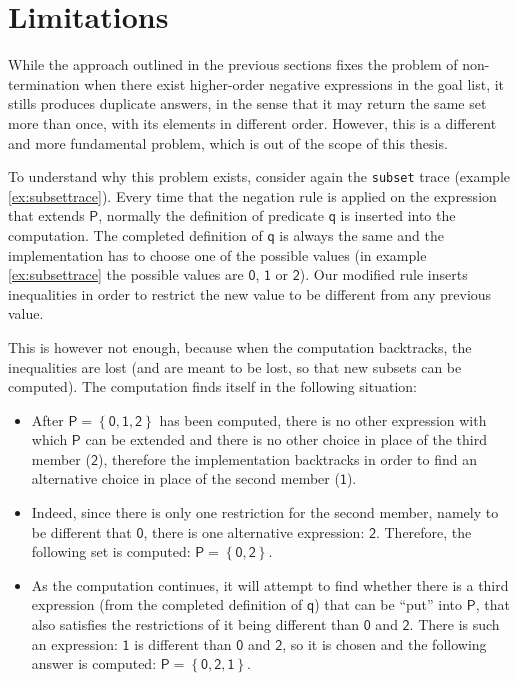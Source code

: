 \documentclass[inscr,ack,preface]{dithesis}
\theoremstyle{definition}
\newcommand{\msf}[1]{$\mathsf{#1}$}
\begin{document}
\section{Limitations}
\label{section:limitations}
While the approach outlined in the previous sections fixes the problem of non-termination when there exist higher-order negative expressions in the goal list, it stills produces duplicate answers, in the sense that it may return the same set more than once, with its elements in different order. However, this is a different and more fundamental problem, which is out of the scope of this thesis.

To understand why this problem exists, consider again the \texttt{subset} trace (example \ref{ex:subsettrace}). Every time that the negation rule is applied on the expression that extends \msf{P}, normally the definition of predicate \msf{q} is inserted into the computation. The completed definition of \msf{q} is always the same and the implementation has to choose one of the possible values (in example \ref{ex:subsettrace} the possible values are \msf{0}, \msf{1} or \msf{2}). Our modified rule inserts inequalities in order to restrict the new value to be different from any previous value.

This is however not enough, because when the computation backtracks, the inequalities are lost (and are meant to be lost, so that new subsets can be computed). The computation finds itself in the following situation:

\begin{itemize}
\item After \msf{P = \left\{ 0, 1, 2 \right\}} has been computed, there is no other expression with which \msf{P} can be extended and there is no other choice in place of the third member (\msf{2}), therefore the implementation backtracks in order to find an alternative choice in place of the second member (\msf{1}).
\item Indeed, since there is only one restriction for the second member, namely to be different that \msf{0}, there is one alternative expression: \msf{2}. Therefore, the following set is computed: \msf{P = \left\{ 0, 2 \right\}}.
\item As the computation continues, it will attempt to find whether there is a third expression (from the completed definition of \msf{q}) that can be ``put'' into \msf{P}, that also satisfies the restrictions of it being different than \msf{0} and \msf{2}. There is such an expression: \msf{1} is different than \msf{0} and \msf{2}, so it is chosen and the following answer is computed: \msf{P = \left\{ 0, 2, 1 \right\}}.
\end{itemize}
\end{document}
